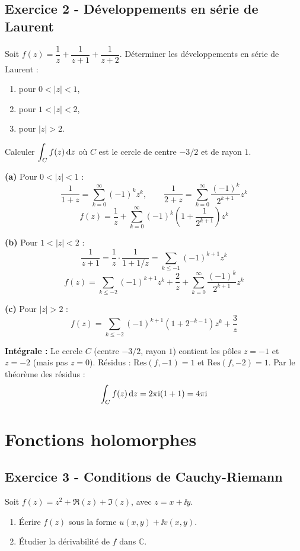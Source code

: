 \documentclass[12pt,a4paper]{article}
\begin{document}
\subsection*{Exercice 2 - Développements en série de Laurent \niveau{\moyen}}

\begin{boiteexercice}
Soit $f(z) = \dfrac{1}{z} + \dfrac{1}{z+1} + \dfrac{1}{z+2}$. Déterminer les développements en série de Laurent :
\begin{enumerate}[label=(\alph*)]
  \item pour $0 < |z| < 1$,
  \item pour $1 < |z| < 2$,
  \item pour $|z| > 2$.
\end{enumerate}
Calculer $\displaystyle\int_C f(z)\,\mathrm{d} z$ où $C$ est le cercle de centre $-3/2$ et de rayon $1$.
\end{boiteexercice}

\begin{boitecorrige}
\textbf{(a)} Pour $0 < |z| < 1$ :
\[
\frac{1}{1+z} = \sum_{k=0}^{\infty}(-1)^k z^k, \qquad \frac{1}{2+z} = \sum_{k=0}^{\infty}\frac{(-1)^k}{2^{k+1}}z^k
\]
\[
f(z) = \frac{1}{z} + \sum_{k=0}^{\infty}(-1)^k\!\left(1+\frac{1}{2^{k+1}}\right)z^k
\]

\textbf{(b)} Pour $1 < |z| < 2$ :
\[
\frac{1}{z+1} = \frac{1}{z}\cdot\frac{1}{1+1/z} = \sum_{k\le -1}(-1)^{k+1}z^k
\]
\[
f(z) = \sum_{k\le -2}(-1)^{k+1}z^k + \frac{2}{z} + \sum_{k=0}^{\infty}\frac{(-1)^k}{2^{k+1}}z^k
\]

\textbf{(c)} Pour $|z| > 2$ :
\[
f(z) = \sum_{k\le -2}(-1)^{k+1}(1+2^{-k-1})z^k + \frac{3}{z}
\]

\textbf{Intégrale :} Le cercle $C$ (centre $-3/2$, rayon $1$) contient les pôles $z=-1$ et $z=-2$ (mais pas $z=0$). Résidus : $\text{Res}(f,-1) = 1$ et $\text{Res}(f,-2) = 1$. Par le théorème des résidus :
\[
\int_C f(z)\,\mathrm{d} z = 2\pi\mathrm{i}(1+1) = 4\pi\mathrm{i}
\]
\end{boitecorrige}

\section{Fonctions holomorphes}

\subsection*{Exercice 3 - Conditions de Cauchy-Riemann \niveau{\facile}}

\begin{boiteexercice}
Soit $f(z) = z^2 + \Re(z) + \Im(z)$, avec $z = x + \ii y$.
\begin{enumerate}
  \item Écrire $f(z)$ sous la forme $u(x,y) + \ii v(x,y)$.
  \item Étudier la dérivabilité de $f$ dans $\mathbb{C}$.
\end{enumerate}
\end{boiteexercice}
\end{document}
